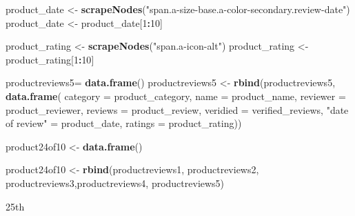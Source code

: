 \documentclass[
]{article}
\newenvironment{Shaded}{\begin{snugshade}}{\end{snugshade}}
\newcommand{\AttributeTok}[1]{\textcolor[rgb]{0.13,0.29,0.53}{#1}}
\newcommand{\DecValTok}[1]{\textcolor[rgb]{0.00,0.00,0.81}{#1}}
\newcommand{\FunctionTok}[1]{\textcolor[rgb]{0.13,0.29,0.53}{\textbf{#1}}}
\newcommand{\NormalTok}[1]{#1}
\newcommand{\OtherTok}[1]{\textcolor[rgb]{0.56,0.35,0.01}{#1}}
\newcommand{\SpecialCharTok}[1]{\textcolor[rgb]{0.81,0.36,0.00}{\textbf{#1}}}
\newcommand{\StringTok}[1]{\textcolor[rgb]{0.31,0.60,0.02}{#1}}
\begin{document}
\begin{Shaded}
\begin{Highlighting}[]
\NormalTok{  product\_date }\OtherTok{\textless{}{-}} \FunctionTok{scrapeNodes}\NormalTok{(}\StringTok{"span.a{-}size{-}base.a{-}color{-}secondary.review{-}date"}\NormalTok{)}
\NormalTok{  product\_date }\OtherTok{\textless{}{-}}\NormalTok{ product\_date[}\DecValTok{1}\SpecialCharTok{:}\DecValTok{10}\NormalTok{]}
  
\NormalTok{  product\_rating }\OtherTok{\textless{}{-}} \FunctionTok{scrapeNodes}\NormalTok{(}\StringTok{"span.a{-}icon{-}alt"}\NormalTok{)}
\NormalTok{  product\_rating }\OtherTok{\textless{}{-}}\NormalTok{ product\_rating[}\DecValTok{1}\SpecialCharTok{:}\DecValTok{10}\NormalTok{]}
  
\NormalTok{  productreviews5}\OtherTok{=} \FunctionTok{data.frame}\NormalTok{()}
\NormalTok{  productreviews5 }\OtherTok{\textless{}{-}} \FunctionTok{rbind}\NormalTok{(productreviews5, }\FunctionTok{data.frame}\NormalTok{(}
                      \AttributeTok{category =}\NormalTok{ product\_category,}
                      \AttributeTok{name =}\NormalTok{ product\_name,}
                      \AttributeTok{reviewer =}\NormalTok{ product\_reviewer,}
                      \AttributeTok{reviews =}\NormalTok{ product\_review,}
                      \AttributeTok{veridied =}\NormalTok{ verified\_reviews,}
                      \StringTok{"date of review"} \OtherTok{=}\NormalTok{ product\_date,}
                      \AttributeTok{ratings =}\NormalTok{ product\_rating))}
  
\NormalTok{  product24of10 }\OtherTok{\textless{}{-}} \FunctionTok{data.frame}\NormalTok{()}
  
\NormalTok{  product24of10 }\OtherTok{\textless{}{-}} \FunctionTok{rbind}\NormalTok{(productreviews1, productreviews2, productreviews3,productreviews4, productreviews5)}
\end{Highlighting}
\end{Shaded}

25th
\end{document}
